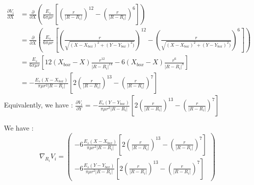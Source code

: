 \documentclass{article}
\begin{document}
\begin{align*}
    \frac{\partial V_i}{\partial X} &= \frac{\partial}{\partial X} \left( \frac{E_s}{6\pi\mu r} \left[ \left( \frac{r}{\lvert R - R_i \rvert} \right)^{12} - \left( \frac{r}{\lvert R - R_i \rvert} \right) ^6 \right] \right) \\
    &= \frac{\partial}{\partial X} \left( \frac{E_s}{6\pi\mu r} \left[ \left( \frac{r}{\sqrt{( X-X_{box})^2 + (Y-Y_{box})^2)}} \right)^{12} - \left( \frac{r}{\sqrt{( X-X_{box})^2 + (Y-Y_{box})^2)}} \right) ^6 \right] \right) \\
    &= \frac{E_s}{6\pi\mu r}\left[ 12(X_{box}-X)\frac{r^{12}}{\lvert R - R_i\rvert^{14}} - 6(X_{box}-X)\frac{r^6}{\lvert R-R_i\rvert^8} \right] \\
    &= -\frac{E_s (X-X_{box})}{\pi\mu r^2 \lvert R - R_i \rvert } \left[ 2 \left( \frac{r}{\lvert R-R_i\rvert} \right)^{13} - \left( \frac{r}{\lvert R-R_i\rvert}\right)^7 \right] 
\end{align*}
Equivalently, we have : $\frac{\partial V_i}{\partial Y}$ = $ - \frac{E_s (Y-Y_{box})}{\pi\mu r^2 \lvert R - R_i \rvert } \left[ 2 \left( \frac{r}{\lvert R-R_i\rvert} \right)^{13} - \left( \frac{r}{\lvert R-R_i\rvert}\right)^7 \right]$

We have : 
\begin{equation*}
    \boxed{\nabla_{R_i} V_i = \begin{pmatrix}
        -6 \frac{E_s (X-X_{box})}{\pi\mu r^2 \lvert R - R_i \rvert } \left[ 2 \left( \frac{r}{\lvert R-R_i\rvert} \right)^{13} - \left( \frac{r}{\lvert R-R_i\rvert}\right)^7 \right] \\
        -6 \frac{E_s (Y-Y_{box})}{\pi\mu r^2 \lvert R - R_i \rvert } \left[ 2 \left( \frac{r}{\lvert R-R_i\rvert} \right)^{13} - \left( \frac{r}{\lvert R-R_i\rvert}\right)^7 \right]
    \end{pmatrix}}
\end{equation*}
\end{document}
